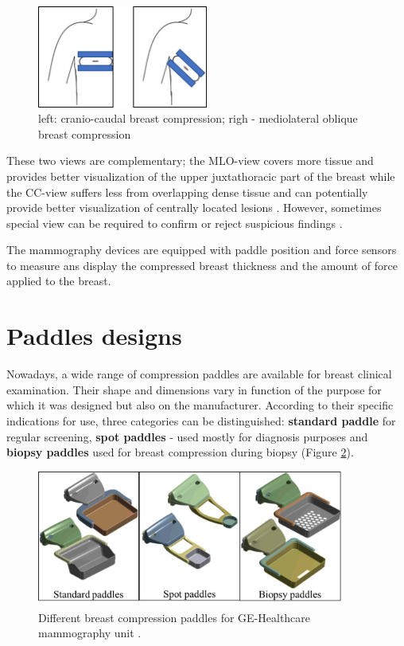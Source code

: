 \begin{figure}[!h]
\centering
\includegraphics[width=0.5\textwidth,keepaspectratio]{figures/cc_mlo_view.jpg} 
\caption{left: cranio-caudal breast compression; righ - mediolateral oblique breast compression }
\label{fig:cc_mlo_view}
\end{figure}

These two views are complementary; the MLO-view covers more tissue and provides better visualization of the upper juxtathoracic part of the breast while the CC-view suffers less from overlapping dense tissue and can potentially provide better visualization of centrally located lesions \citep{ikeda_second_1988,kim_computer_2006}. However, sometimes special view can be required  to confirm or reject suspicious findings \citep{groot_towards_2015}. 

The mammography devices are equipped with paddle position and force sensors to measure ans display the compressed breast thickness and the amount of force applied to the breast.

\section{Paddles designs} \label{section:compressionpaddlesdesign}

Nowadays, a wide range of compression paddles are available for breast clinical examination. Their shape and dimensions vary in function of the purpose for which it was designed but also on the manufacturer. According to their specific
indications for use, three categories can be distinguished: \textbf{standard paddle} for regular screening, \textbf{spot paddles} - used mostly for diagnosis purposes and \textbf{biopsy paddles} used for breast compression during biopsy (Figure \ref{fig:compressionpaddlestypes}). 


\begin{figure}[!h]
\centering
\includegraphics[width=0.9\textwidth,keepaspectratio]{figures/compressionpaddlestypes.jpg} 
\caption{Different breast compression paddles for GE-Healthcare mammography unit .}\label{fig:compressionpaddlestypes}
\end{figure}
    

